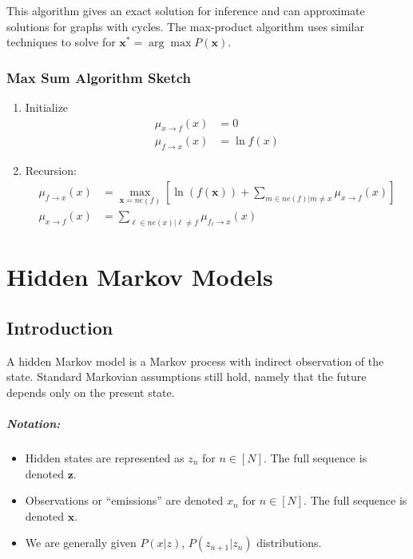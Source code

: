 \documentclass[a4paper,12pt]{report}
\begin{document}
This algorithm gives an exact solution for inference and can approximate solutions for graphs with cycles. The max-product algorithm uses similar techniques to solve for $\pmb x^* = \arg\max P(\pmb x)$.

\subsection{Max Sum Algorithm Sketch}

\begin{enumerate}
\item Initialize 
\begin{equation}
\begin{split}
\mu_{x\to f}(x) &= 0 \\
\mu_{f\to x}(x) &= \ln f(x)
\end{split}
\end{equation}

\item Recursion: 
\begin{equation}
\begin{split}
\mu_{f\to x}(x) &= \max_{\pmb x = ne(f)}[\ln(f(\pmb x)) + \sum_{m\in ne(f) | m \neq x}^{} \mu_{x\to f} (x) ] \\
\mu_{x\to f}(x) &= \sum_{\ell \in ne(x) | \ell \neq f}^{} \mu_{f_\ell \to x}(x)
\end{split}
\end{equation}
\end{enumerate}




\chapter{Hidden Markov Models}

\section{Introduction}

A hidden Markov model is a Markov process with indirect observation of the state. Standard Markovian assumptions still hold, namely that the future depends only on the present state.

\paragraph{Notation: } 
\begin{itemize}
\item Hidden states are represented as $z_n$ for $n\in [N]$. The full sequence is denoted $\pmb z$.
\item Observations or ``emissions'' are denoted $x_n$ for $n\in [N]$. The full sequence is denoted $\pmb x$.
\item We are generally given $P(x | z)$, $P(z_{n+1} | z_n)$ distributions.
\end{itemize}
\end{document}
